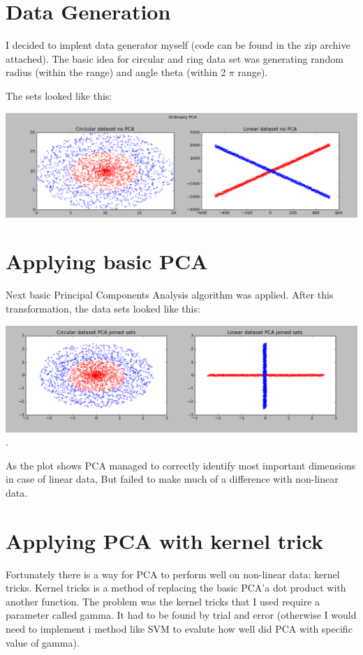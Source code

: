 \documentclass{article}
\begin{document}
\section{Data Generation}

  I decided to implent data generator myself (code can be found in the zip archive attached).
  The basic idea for circular and ring data set was generating random radius (within the range) and
  angle theta (within 2 $\pi$ range).

The sets looked like this:

\includegraphics[width=\textwidth]{basic_sets}

\section{Applying basic PCA}

Next basic Principal Components Analysis algorithm was applied. After this transformation, the data sets looked like this:

\includegraphics[width=\textwidth]{pca_sets}.

As the plot shows PCA managed to correctly identify most important dimensions in case of linear data,
But failed to make much of a difference with non-linear data.

\section{Applying PCA with kernel trick}

Fortunately there is a way for PCA to perform well on non-linear data: kernel tricks. Kernel tricks is a method of
replacing the basic PCA'a dot product with another function. The problem was the kernel tricks that  I used require
a parameter called gamma. It had to be found by trial and error (otherwise I would need to implement i method like SVM
to evalute how well did PCA with specific value of gamma).
\end{document}
